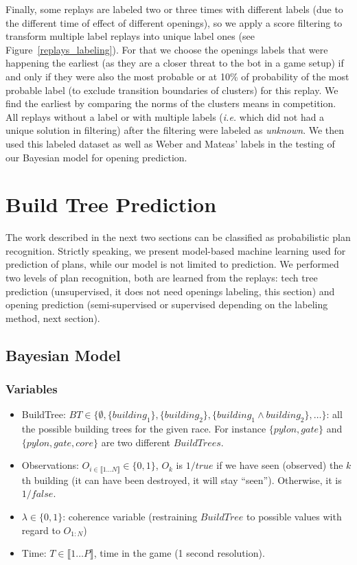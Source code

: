 Finally, some replays are labeled two or three times with different labels (due to the different time of effect of different openings), so we apply a score filtering to transform multiple label replays into unique label ones (see Figure~\ref{replays_labeling}). For that we choose the openings labels that were happening the earliest (as they are a closer threat to the bot in a game setup) if and only if they were also the most probable or at 10\% of probability of the most probable label (to exclude transition boundaries of clusters) for this replay. We find the earliest by comparing the norms of the clusters means in competition. All replays without a label or with multiple labels (\textit{i.e.} which did not had a unique solution in filtering) after the filtering were labeled as \textit{unknown}. We then used this labeled dataset as well as Weber and Mateas' labels in the testing of our Bayesian model for opening prediction.

\clearpage

\section{Build Tree Prediction}
\label{sec:strategyprediction}
The work described in the next two sections can be classified as probabilistic plan recognition. Strictly speaking, we present model-based machine learning used for prediction of plans, while our model is not limited to prediction. We performed two levels of plan recognition, both are learned from the replays: tech tree prediction (unsupervised, it does not need openings labeling, this section) and opening prediction (semi-supervised or supervised depending on the labeling method, next section).

\label{sec:techtreepred}

\subsection{Bayesian Model}
\subsubsection{Variables}
\begin{itemize}
\item BuildTree: $BT \in \{\emptyset, \{building_1\}, \{building_2\}, \{building_1\wedge building_2\}, \dots\}$: all the possible building trees for the given race. For instance $\{pylon, gate\}$ and $\{pylon, gate, core\}$ are two different $BuildTrees$.
\item Observations: $O_{i \in \llbracket 1\dots N \rrbracket} \in \{0, 1\}$, $O_k$ is $1/true$ if we have seen (observed) the $k$th building (it can have been destroyed, it will stay ``seen''). Otherwise, it is $1/false$.
\item $\lambda \in \{0, 1\}$: coherence variable (restraining $BuildTree$ to possible values with regard to $O_{1:N}$)
\item Time: $T \in \llbracket 1\dots P \rrbracket$, time in the game (1 second resolution).
\end{itemize}

